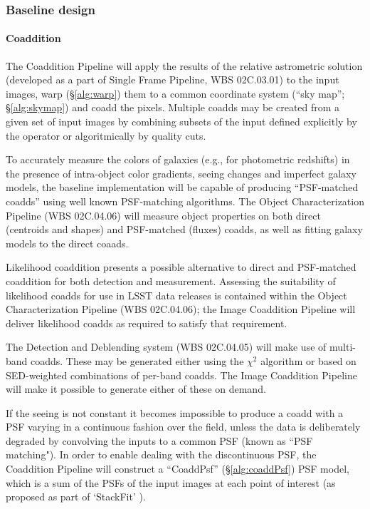 \documentclass[12pt]{article}
\newcommand{\wbsSFM}{WBS 02C.03.01}
\newcommand{\wbsDetDeblend}{WBS 02C.04.05}
\newcommand{\wbsObjChar}{WBS 02C.04.06}
\begin{document}
\subsubsection{Baseline design}

\paragraph{Coaddition}
\label{alg:coadd}

The Coaddition Pipeline will apply the results of the relative astrometric solution (developed as a part of Single Frame Pipeline, \wbsSFM) to the input images, warp (\S\ref{alg:warp}) them to a common coordinate system (``sky map''; \S\ref{alg:skymap}) and coadd the pixels. Multiple coadds may be created from a given set of input images by combining subsets of the input defined explicitly by the operator or algoritmically by quality cuts.

To accurately measure the colors of galaxies (e.g., for photometric redshifts) in the presence of intra-object color gradients, seeing changes and imperfect galaxy models, the baseline implementation will be capable of producing ``PSF-matched coadds'' using well known PSF-matching algorithms. The Object Characterization Pipeline (\wbsObjChar) will measure object properties on both direct (centroids and shapes) and PSF-matched (fluxes) coadds, as well as fitting galaxy models to the direct coaads.

Likelihood coaddition presents a possible alternative to direct and PSF-matched coaddition for both detection and measurement. Assessing the suitability of likelihood coadds for use in LSST data releases is contained within the Object Characterization Pipeline (\wbsObjChar); the Image Coaddition Pipeline will deliver likelihood coadds as required to satisfy that requirement.

The Detection and Deblending system (\wbsDetDeblend) will make use of multi-band coadds. These may be generated either using the $\chi^2$ algorithm \cite{Szalay99} or based on SED-weighted combinations of per-band coadds. The Image Coaddition Pipeline will make it possible to generate either of these on demand.

If the seeing is not constant it becomes impossible to produce a coadd with a PSF varying in a continuous fashion over the field, unless the data is deliberately degraded by convolving the inputs to a common PSF (known as ``PSF matching").  In order to enable dealing with the discontinuous PSF, the Coaddition Pipeline will construct a ``CoaddPsf'' (\S\ref{alg:coaddPsf}) PSF model, which is a sum of the PSFs of the input images at each point of interest (as proposed as part of `StackFit' \cite{Jee13}).
\end{document}
